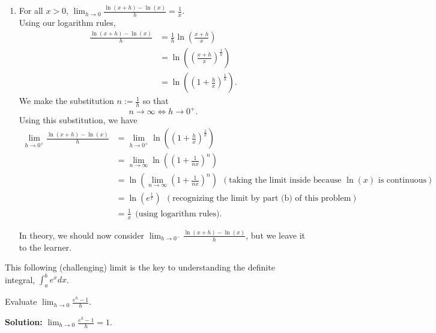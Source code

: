 \begin{enumerate}
\item \Ans For all $x>0$, $\displaystyle \lim_{h \to 0} \frac{\ln(x + h) - \ln(x)}{h} = \frac{1}{x}$.\\

Using our logarithm rules, 
\begin{align*}
     \frac{\ln(x + h) - \ln(x)}{h} &= \frac{1}{h} \ln \left( \frac{x+h}{x} \right) \\
     & = \ln \left( \left(\frac{x+h}{x} \right)^\frac{1}{h} \right) \\
     & =  \ln \left( \left( 1 + \frac{h}{x} \right)^\frac{1}{h} \right).
\end{align*}
We make the substitution $n := \frac{1}{h}$ so that
$$  n \to \infty \iff h \to 0^+.$$
Using this substitution, we have 
\begin{align*}
    \lim_{h \to 0^+} \frac{\ln(x + h) - \ln(x)}{h} & = \lim_{h \to 0^+}  \ln \left( \left( 1 + \frac{h}{x} \right)^\frac{1}{h} \right) \\
    &= \lim_{n \to \infty} \ln \left( \left( 1 + \frac{1}{n x} \right)^n \right)\\
    & = \ln  \left( \lim_{n \to \infty}  \left( 1 + \frac{1}{n x} \right)^n  \right) ~~(\text{taking the limit inside because } \ln(x) \text{ is continuous}) \\
    &  = \ln \left(  e^\frac{1}{x} \right) ~~(\text{recognizing the limit by part (b) of this problem})\\
    & = \frac{1}{x} ~~\text{(using logarithm rules)}.
\end{align*}

In theory, we should now consider $\displaystyle \lim_{h \to 0^-} \frac{\ln(x + h) - \ln(x)}{h}$, but we leave it to the learner.

\end{enumerate} 

\Qed

\bigskip
This following (challenging) limit is the key to understanding the definite integral, $\int_a^b e^x dx$.
\bigskip

\begin{example} 
\label{ex:KeyExponentialLimit} 
Evaluate $\displaystyle \lim_{h \to 0} \frac{e^h - 1}{h}$.     
\end{example}

\textbf{Solution:} \Ans $\displaystyle \lim_{h \to 0} \frac{e^h - 1}{h} = 1$.\\


